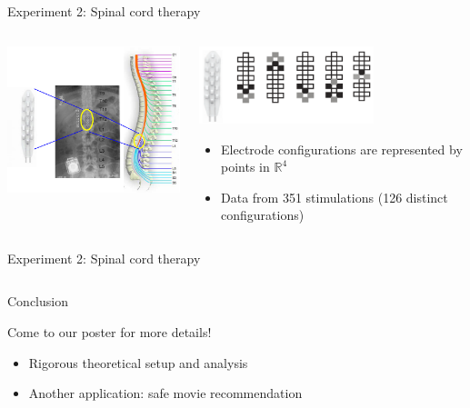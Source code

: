 \documentclass[xetex,10pt,mathserif]{beamer}
\newlength\figureheight
\newlength\figurewidth
\begin{document}
\begin{frame}{Experiment 2: Spinal cord therapy}
\begin{columns}[c]
\begin{center}
\includegraphics[width=2.5in]{figures/config1.png}
\end{center}
\begin{center}
\includegraphics[width=2in]{figures/config2.png}
\vspace{2em}
\begin{itemize}
\item Electrode configurations are represented by points in $\mathbb{R}^4$
\vspace{1em}
\item Data from 351 stimulations (126 distinct configurations)
\end{itemize}
\end{center}
\end{columns}
\end{frame}

\begin{frame}{Experiment 2: Spinal cord therapy}
\begin{columns}[c]
\begin{center}
\setlength\figurewidth{2.5in}
\setlength\figureheight{1.7in}
\end{center}
\centering
\setlength\figurewidth{2.5in}
\setlength\figureheight{3.7in}
\end{columns}
\end{frame}

\begin{frame}{Conclusion}

{\large Come to our poster for more details!}
\vspace{2em}
\begin{itemize}
  \item Rigorous theoretical setup and analysis
  \vspace{1em}
  \item Another application: safe movie recommendation
\end{itemize}
\end{frame}
\end{document}
